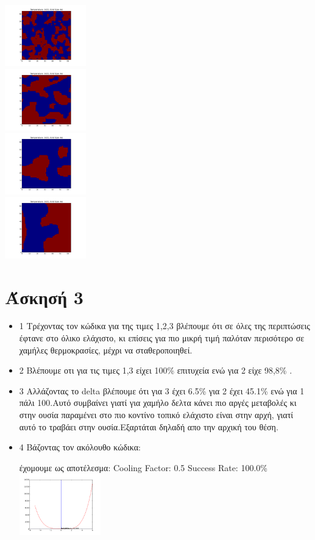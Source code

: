 \documentclass{article}
\begin{document}
\begin{itemize}
		\includegraphics[heigh=100pt,width=100pt]{fig3} \\
		\includegraphics[heigh=100pt,width=100pt]{fig4} \\
		\includegraphics[heigh=100pt,width=100pt]{fig5} \\
		\includegraphics[heigh=100pt,width=100pt]{fig6}
\end{itemize}
\section*{Άσκησή 3}
\begin{itemize}
	\item 1
		Τρέχοντας τον κώδικα για της τιμες 1,2,3 βλέπουμε ότι σε όλες της περιπτώσεις έφτανε στο όλικο ελάχιστο, κι επίσεις για πιο μικρή τιμή παλόταν περισότερο σε χαμήλες θερμοκρασίες, μέχρι να σταθεροποιηθεί.
	\item 2
		Βλέπουμε οτι για τις τιμες 1,3 είχει 100\% επιτυχεία ενώ για 2 είχε 98,8\% .
	\item 3
		Αλλάζοντας το delta βλέπουμε ότι για 3 έχει 6.5\% για 2 έχει 45.1\% ενώ για 1 πάλι 100.Αυτό συμβαίνει γιατί για χαμήλο δελτα κάνει πιο αργές μεταβολές κι στην ουσία παραμένει στο πιο κοντίνο τοπικό ελάχιστο είναι στην αρχή, γιατί αυτό το τραβάει στην ουσία.Εξαρτάται δηλαδή απο την αρχική του θέση.
\item 4 
	Βάζοντας τον ακόλουθο κώδικα:

έχομουμε ως αποτέλεσμα: 
Cooling Factor:  0.5
Success Rate:  100.0\%
\\
		\includegraphics[heigh=100pt,width=100pt]{ex31} \\
\end{itemize}
\end{document}
